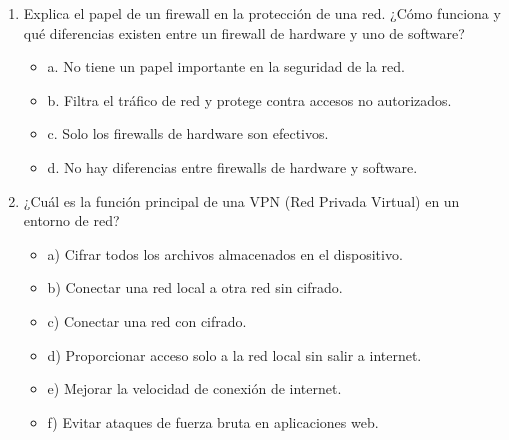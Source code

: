 \documentclass[a4paper]{article}
\begin{document}
\begin{enumerate}
    \item Explica el papel de un firewall en la protección de una red. 
    ¿Cómo funciona y qué diferencias existen entre un firewall de hardware y uno de software?
    \begin{itemize}
        \item a. No tiene un papel importante en la seguridad de la red.
        \item b. Filtra el tráfico de red y protege contra accesos no autorizados.
        \item c. Solo los firewalls de hardware son efectivos.
        \item d. No hay diferencias entre firewalls de hardware y software.
    \end{itemize}
    
    \item ¿Cuál es la función principal de una VPN (Red Privada Virtual) en un entorno de red?
    \begin{itemize}
        \item a) Cifrar todos los archivos almacenados en el dispositivo.
        \item b) Conectar una red local a otra red sin cifrado.
        \item c) Conectar una red con cifrado.
        \item d) Proporcionar acceso solo a la red local sin salir a internet.
        \item e) Mejorar la velocidad de conexión de internet.
        \item f) Evitar ataques de fuerza bruta en aplicaciones web.
    \end{itemize}
    

\end{enumerate}
\end{document}
